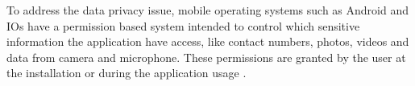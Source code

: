 To address the data privacy issue, mobile operating systems such as Android and IOs have a permission based system intended to control which sensitive information the application have access, like contact numbers, photos, videos and data from camera and microphone. These permissions are granted by the user at the installation or during the application usage \cite{androidpermissions}.
